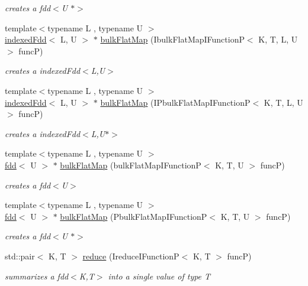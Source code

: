 \begin{DoxyCompactItemize}
\begin{DoxyCompactList}\small\item\em creates a fdd$<$\+U $\ast$$>$ \end{DoxyCompactList}\item 
{\footnotesize template$<$typename L , typename U $>$ }\\\hyperlink{classfaster_1_1indexedFdd}{indexed\+Fdd}$<$ L, U $>$ $\ast$ \hyperlink{group__bulk_ga3912bcd68abe5012c0573f1b2df4c5ad}{bulk\+Flat\+Map} (Ibulk\+Flat\+Map\+I\+FunctionP$<$ K, T, L, U $>$ funcP)
\begin{DoxyCompactList}\small\item\em creates a indexed\+Fdd$<$\+L,\+U$>$ \end{DoxyCompactList}\item 
{\footnotesize template$<$typename L , typename U $>$ }\\\hyperlink{classfaster_1_1indexedFdd}{indexed\+Fdd}$<$ L, U $>$ $\ast$ \hyperlink{group__bulk_ga1c49efc7eac095aaefb1446f31147536}{bulk\+Flat\+Map} (I\+Pbulk\+Flat\+Map\+I\+FunctionP$<$ K, T, L, U $>$ funcP)
\begin{DoxyCompactList}\small\item\em creates a indexed\+Fdd$<$\+L,\+U$\ast$$>$ \end{DoxyCompactList}\item 
{\footnotesize template$<$typename L , typename U $>$ }\\\hyperlink{classfaster_1_1fdd}{fdd}$<$ U $>$ $\ast$ \hyperlink{group__bulk_gaa06dfd667524b0ec9e10edf666414715}{bulk\+Flat\+Map} (bulk\+Flat\+Map\+I\+FunctionP$<$ K, T, U $>$ funcP)
\begin{DoxyCompactList}\small\item\em creates a fdd$<$\+U$>$ \end{DoxyCompactList}\item 
{\footnotesize template$<$typename L , typename U $>$ }\\\hyperlink{classfaster_1_1fdd}{fdd}$<$ U $>$ $\ast$ \hyperlink{group__bulk_ga811004fa92fc8685402fd10584b7863a}{bulk\+Flat\+Map} (Pbulk\+Flat\+Map\+I\+FunctionP$<$ K, T, U $>$ funcP)
\begin{DoxyCompactList}\small\item\em creates a fdd$<$\+U $\ast$$>$ \end{DoxyCompactList}\item 
std\+::pair$<$ K, T $>$ \hyperlink{group__flatmap_ga1b2c52816eb473decdd3e06c70db255b}{reduce} (Ireduce\+I\+FunctionP$<$ K, T $>$ funcP)
\begin{DoxyCompactList}\small\item\em summarizes a fdd$<$\+K,\+T$>$ into a single value of type T \end{DoxyCompactList}\item 

\end{DoxyCompactItemize}

